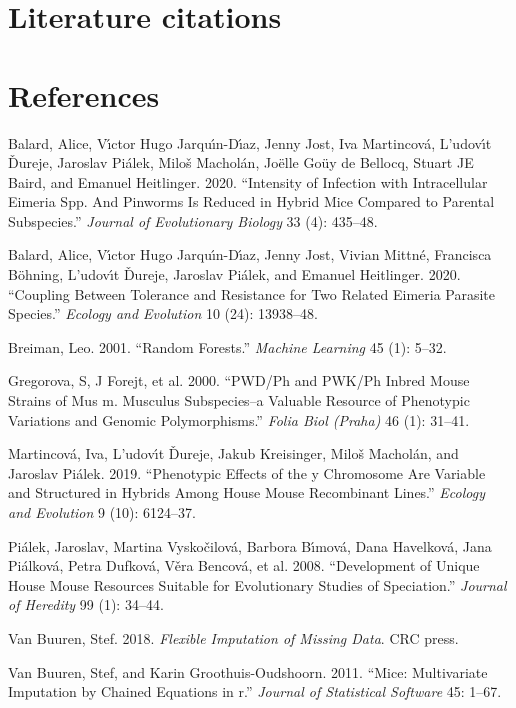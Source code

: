 \documentclass[
]{article}
\newlength{\cslhangindent}
\newlength{\cslentryspacingunit} %
\newenvironment{CSLReferences}[2] %
 {%
  \setlength{\parindent}{0pt}
  \ifodd #1
  \let\oldpar\par
  \def\par{\hangindent=\cslhangindent\oldpar}
  \fi
  \setlength{\parskip}{#2\cslentryspacingunit}
 }%
 {}
\begin{document}
\hypertarget{literature-citations}{%
\section{Literature citations}\label{literature-citations}}

\hypertarget{references}{%
\section*{References}\label{references}}

\hypertarget{refs}{}
\begin{CSLReferences}{1}{0}
\leavevmode{}%
Balard, Alice, Vı́ctor Hugo Jarquı́n-Dı́az, Jenny Jost, Iva Martincová,
L'udovı́t Ďureje, Jaroslav Piálek, Miloš Macholán, Joëlle Goüy de
Bellocq, Stuart JE Baird, and Emanuel Heitlinger. 2020. {``Intensity of
Infection with Intracellular Eimeria Spp. And Pinworms Is Reduced in
Hybrid Mice Compared to Parental Subspecies.''} \emph{Journal of
Evolutionary Biology} 33 (4): 435--48.

\leavevmode{}%
Balard, Alice, Vı́ctor Hugo Jarquı́n-Dı́az, Jenny Jost, Vivian Mittné,
Francisca Böhning, L'udovı́t Ďureje, Jaroslav Piálek, and Emanuel
Heitlinger. 2020. {``Coupling Between Tolerance and Resistance for Two
Related Eimeria Parasite Species.''} \emph{Ecology and Evolution} 10
(24): 13938--48.

\leavevmode{}%
Breiman, Leo. 2001. {``Random Forests.''} \emph{Machine Learning} 45
(1): 5--32.

\leavevmode{}%
Gregorova, S, J Forejt, et al. 2000. {``PWD/Ph and PWK/Ph Inbred Mouse
Strains of Mus m. Musculus Subspecies--a Valuable Resource of Phenotypic
Variations and Genomic Polymorphisms.''} \emph{Folia Biol (Praha)} 46
(1): 31--41.

\leavevmode{}%
Martincová, Iva, L'udovı́t Ďureje, Jakub Kreisinger, Miloš Macholán, and
Jaroslav Piálek. 2019. {``Phenotypic Effects of the y Chromosome Are
Variable and Structured in Hybrids Among House Mouse Recombinant
Lines.''} \emph{Ecology and Evolution} 9 (10): 6124--37.

\leavevmode{}%
Piálek, Jaroslav, Martina Vyskočilová, Barbora Bı́mová, Dana Havelková,
Jana Piálková, Petra Dufková, Věra Bencová, et al. 2008. {``Development
of Unique House Mouse Resources Suitable for Evolutionary Studies of
Speciation.''} \emph{Journal of Heredity} 99 (1): 34--44.

\leavevmode{}%
Van Buuren, Stef. 2018. \emph{Flexible Imputation of Missing Data}. CRC
press.

\leavevmode{}%
Van Buuren, Stef, and Karin Groothuis-Oudshoorn. 2011. {``Mice:
Multivariate Imputation by Chained Equations in r.''} \emph{Journal of
Statistical Software} 45: 1--67.

\end{CSLReferences}
\end{document}

